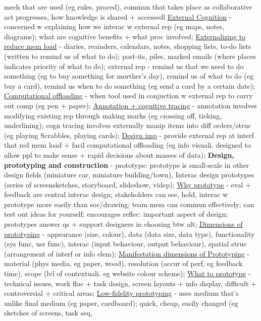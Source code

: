 \documentclass[a4paper]{article}
\begin{document}
\begin{multicols}{3}
        mech that are used (eg rules, proced), commun that takes place as collaborative act progresses, how knowledge is shared + accessedl \underline{External Cognition} - concerned w explaining
        how we interac w external rep (eg maps, notes, diagrams); what are cognitive benefits + what proc involved; \underline{Externalizing to reduce mem load} - diaries, reainders, calendars, notes,
        shopping lists, to-do lists (written to remind us of what to do); post-its, piles, marked emails (where places indicates priority of what to do); external rep - remind us that we need to do
        something (eg to buy something for morther's day), remind us of what to do (eg buy a card), remind us when to do something (eg send a card by a certain date); \underline{Computational offloading}
        - when tool used in conjuction w external rep to carry out comp (eg pen + paper); \underline{Annotation + cognitive tracing} - annotation involves modifying existing rep through making marks (eg crossing
        off, ticking, underlining); cogn tracing involves externally manip items into diff orders/struc (eg playing Scrabbles, playing cards); \underline{Design imp} - provide external rep at interf that red mem load
        + facil computational offloading (eg info visuali. designed to allow ppl to make sense + rapid decisions about masses of data); \newline \textbf{Design, prototyping and construction} -
        prototype: prototype is small-scale in other design fields (miniature car, miniature building/town), Interac design prototypes (series of screensketches, storyboard, slideshow, videp); \underline{Why prototype} -
        eval + feedback are central interac design; stakeholders can see, hold, interac w prototype more easily than soc/drawing; team mem can commun effectively; can test out ideas for yourself; encourages
        reflec: important aspect of design; prototypes answer qs + support designers in choosing btw alt; \underline{Dimensions of prototyping} - appearance (size, colour), data (data size, data type), functionality (sys func, usr func),
        interac (input behaviour, output behaviour), spatial struc (arrangement of interf or info elem); \underline{Manifestation dimensions of Prototyping} - material (phys media, eg paper, wood), resolution (accur
        of perf, eg feedback time), scope (lvl of contextuali. eg website colour scheme); \underline{What to prototype} - technical issues, work floc + task design, screen layouts + info
        display, difficult + controversial + critical areas; \underline{Low-fidelity prototyping} - uses medium that's unlike final medium (eg paper, cardboard); quick, cheap, easily changed (eg sketches of screens, task seq,

\end{multicols}
\end{document}
